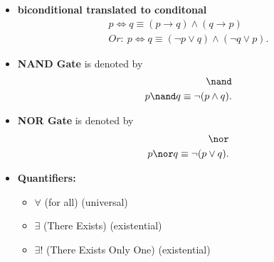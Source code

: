 \documentclass{report}
\begin{document}
\begin{itemize}
        \bigbreak \noindent 
      \item \textbf{biconditional translated to conditonal}
        \begin{align*}
          p \iff q \equiv (p \rightarrow q) \land (q \rightarrow p) \\
          Or:\ p \iff q \equiv (\neg p \lor q) \land (\neg q \lor p)
        .\end{align*}
      \item \textbf{NAND Gate} is denoted by
        \begin{align*}
          \nand \\
          p \nand q \equiv \neg (p\land q)
        .\end{align*}
      \item \textbf{NOR Gate} is denoted by
        \begin{align*}
          \nor \\
          p \nor q \equiv \neg(p\lor q)
        .\end{align*}
      \item \textbf{Quantifiers:}
        \begin{itemize}
          \item $\forall$ (for all) (universal)
          \item $\exists$ (There Exists) (existential)
          \item $\exists$! (There Exists Only One) (existential)
        \end{itemize}
    \end{itemize}

    \pagebreak \bigbreak \noindent 
\end{document}
